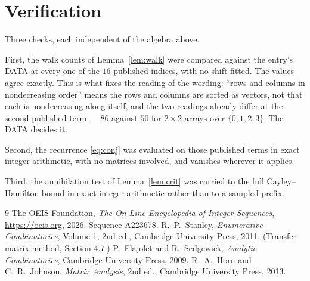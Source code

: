 \documentclass[11pt,a4paper]{article}
\theoremstyle{plain}
\theoremstyle{definition}
\begin{document}
\section{Verification}

Three checks, each independent of the algebra above.

First, the walk counts of Lemma~\ref{lem:walk} were compared against the entry's DATA at
every one of the $16$ published indices, with no shift fitted. The values agree exactly.
This is what fixes the reading of the wording: ``rows and columns in nondecreasing order''
means the rows and columns are sorted as vectors, not that each is nondecreasing along
itself, and the two readings already differ at the second published term --- $86$ against
$50$ for $2\times2$ arrays over $\{0,1,2,3\}$. The DATA decides it.

Second, the recurrence \eqref{eq:conj} was evaluated on those published terms in exact
integer arithmetic, with no matrices involved, and vanishes wherever it applies.

Third, the annihilation test of Lemma~\ref{lem:crit} was carried to the full
Cayley--Hamilton bound in exact integer arithmetic rather than to a sampled prefix.

\begin{thebibliography}{9}
 The OEIS Foundation, \emph{The On-Line Encyclopedia of Integer
Sequences}, \url{https://oeis.org}, 2026. Sequence A223678.
 R.~P.~Stanley, \emph{Enumerative Combinatorics}, Volume 1, 2nd ed.,
Cambridge University Press, 2011. (Transfer-matrix method, Section 4.7.)
 P.~Flajolet and R.~Sedgewick, \emph{Analytic Combinatorics}, Cambridge
University Press, 2009.
 R.~A.~Horn and C.~R.~Johnson, \emph{Matrix Analysis}, 2nd ed., Cambridge
University Press, 2013.
\end{thebibliography}
\end{document}
